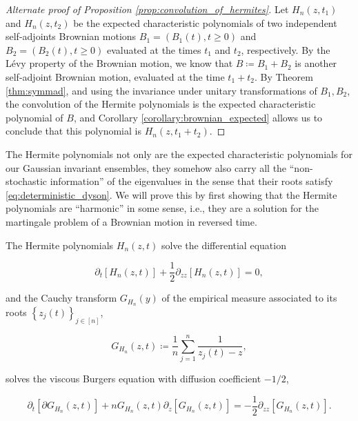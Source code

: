     \begin{proof}[Alternate proof of Proposition \ref{prop:convolution_of_hermites}]
        Let $H_n(z,t_1)$ and $H_n(z,t_2)$ be the expected characteristic polynomials of two independent self-adjoints Brownian motions $B_1 = (B_1(t), t\ge 0)$ and  $B_2 = (B_2 (t), t\ge0)$ evaluated at the times $t_1$ and $t_2$, respectively. By the Lévy property of the Brownian motion, we know that $B \coloneqq B_1 + B_2$ is another self-adjoint Brownian motion, evaluated at the time $t_1 + t_2$. By Theorem \ref{thm:symmad}, and using the invariance under unitary transformations of $B_1, B_2$, the convolution of the Hermite polynomials is the expected characteristic polynomial of $B$, and Corollary \ref{corollary:brownian_expected} allows us to conclude that this polynomial is $H_n(z,t_1 + t_2)$.
    \end{proof}

    The Hermite polynomials not only are the expected characteristic polynomials for our Gaussian invariant ensembles, they somehow also carry all the ``non-stochastic information'' of the eigenvalues in the sense that their roots satisfy \eqref{eq:deterministic_dyson}. We will prove this by first showing that the Hermite polynomials are ``harmonic'' in some sense, i.e., they are a solution for the martingale problem of a Brownian motion in reversed time. 

\begin{theorem} \label{thm:heat_burgers}
    The Hermite polynomials $H_n(z,t)$ solve the differential equation

    \begin{equation} \label{eq:calor}
      \partial_t [H_n(z,t)] + \frac12 \partial_{zz}[H_n(z,t)] = 0,
    \end{equation}

    \noindent and the Cauchy transform $G_{H_n}(y)$ of the empirical measure associated to its roots $\left\{ z_j(t) \right\}_{j\in [n]}$, 
    
    \begin{equation*}
        G_{H_n}(z,t) \coloneqq \frac1n \sum_{j=1}^n \frac{1}{z_j(t) - z},
    \end{equation*}

    \noindent solves the viscous Burgers equation with diffusion coefficient $-1/2$,

    \begin{equation*} \label{eq:burgers_12}
        {\partial_t}[\partial G_{H_n}(z,t)] + nG_{H_n}(z,t)\partial_z[G_{H_n}(z,t)] = -\frac12  \partial_{zz}[G_{H_n}(z,t)].
    \end{equation*}
    
\end{theorem}

